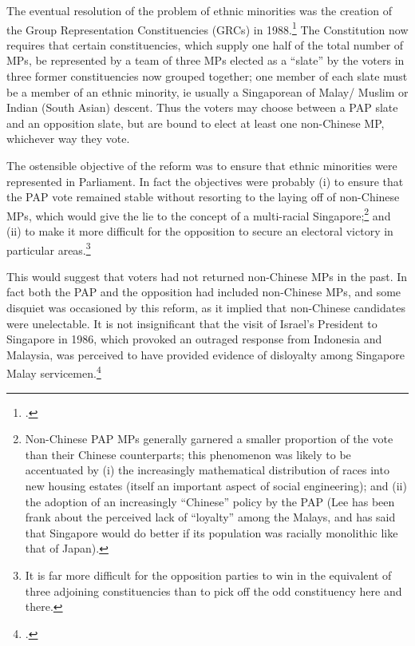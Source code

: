 The eventual resolution of the problem of ethnic minorities was
the creation of the Group Representation Constituencies (GRCs) in
1988.\footnote{ .} The Constitution now
requires that certain constituencies, which supply one half of
the total number of MPs, be represented by a team of three MPs
elected as a ``slate'' by the voters in three former
constituencies now grouped together; one member of each slate
must be a member of an ethnic minority, ie usually a Singaporean
of Malay/ Muslim or Indian (South Asian) descent. Thus the voters
may choose between a PAP slate and an opposition slate, but are
bound to elect at least one non-Chinese MP, whichever way they
vote.

The ostensible objective of the reform was to ensure that ethnic
minorities were represented in Parliament. In fact the objectives
were probably (i) to ensure that the PAP vote remained stable
without resorting to the laying off of non-Chinese MPs, which
would give the lie to the concept of a multi-racial
Singapore;\footnote{ Non-Chinese PAP MPs generally garnered a
  smaller proportion of the vote than their Chinese counterparts;
  this phenomenon was likely to be accentuated by (i) the
  increasingly mathematical distribution of races into new
  housing estates (itself an important aspect of social
  engineering); and (ii) the adoption of an increasingly
  ``Chinese'' policy by the PAP (Lee has been frank about the
  perceived lack of ``loyalty'' among the Malays, and has said
  that Singapore would do better if its population was racially
  monolithic like that of Japan).} and (ii) to make it more
difficult for the opposition to secure an electoral victory in
particular areas.\footnote{ It is far more difficult for the
  opposition parties to win in the equivalent of three adjoining
  constituencies than to pick off the odd constituency here and
  there.}
 

This would suggest that voters had not returned non-Chinese MPs
in the past. In fact both the PAP and the opposition had included
non-Chinese MPs, and some disquiet was occasioned by this reform,
as it implied that non-Chinese candidates were unelectable.  It
is not insignificant that the visit of Israel's President to
Singapore in 1986, which provoked an outraged response from
Indonesia and Malaysia, was perceived to have provided evidence
of disloyalty among Singapore Malay servicemen.\footnote{
  .}


